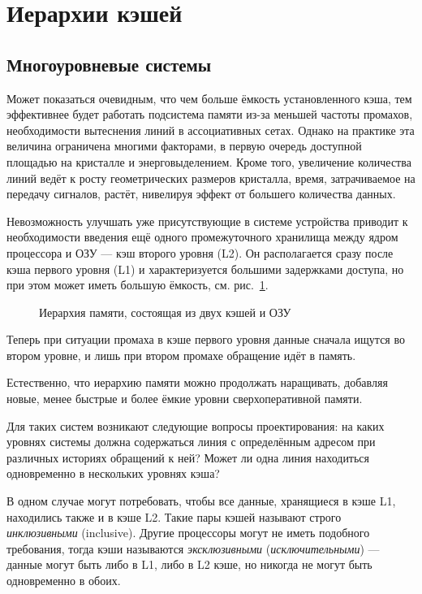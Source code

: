 \section{Иерархии кэшей}

\subsection{Многоуровневые системы}

Может показаться очевидным, что чем больше ёмкость установленного кэша, тем эффективнее будет работать подсистема памяти из-за меньшей частоты промахов, необходимости вытеснения линий в ассоциативных сетах. Однако на практике эта величина ограничена многими факторами, в первую очередь доступной площадью на кристалле и энерговыделением. Кроме того, увеличение количества линий ведёт к росту геометрических размеров кристалла, время, затрачиваемое на передачу сигналов, растёт, нивелируя эффект от большего количества данных.

Невозможность улучшать уже присутствующие в системе устройства приводит к необходимости введения ещё одного промежуточного хранилища между ядром процессора и ОЗУ — кэш второго уровня (L2). Он располагается сразу после кэша первого уровня (L1) и характеризуется большими задержками доступа, но при этом может иметь большую ёмкость, см. рис.~\ref{fig:l1l2}.

\begin{figure}[htb]
    \centering
    \caption{Иерархия памяти, состоящая из двух кэшей и ОЗУ}
    \label{fig:l1l2}
\end{figure}


Теперь при ситуации промаха в кэше первого уровня данные сначала ищутся во втором уровне, и лишь при втором промахе обращение идёт в память. 

Естественно, что иерархию памяти можно продолжать наращивать, добавляя новые, менее быстрые и более ёмкие уровни сверхоперативной памяти. %

Для таких систем возникают следующие вопросы проектирования: на каких уровнях системы должна содержаться линия с определённым адресом при различных историях обращений к ней? Может ли одна линия находиться одновременно в нескольких уровнях кэша?

В одном случае могут потребовать, чтобы все данные, хранящиеся в кэше L1, находились также и в кэше L2. Такие пары кэшей называют строго \textit{инклюзивными} (\abbr inclusive). Другие процессоры могут не иметь подобного требования, тогда кэши называются \textit{эксклюзивными} (\textit{исключительными})  — данные могут быть либо в L1, либо в L2 кэше, но никогда не могут быть одновременно в обоих.


